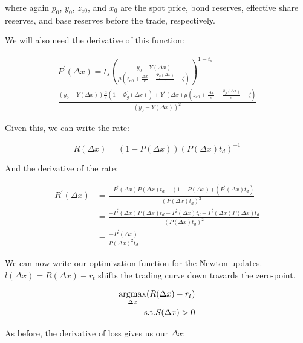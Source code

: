 where again $p_{0}$, $y_{0}$, $z_{e0}$, and $x_{0}$ are the spot price, bond reserves, effective share reserves, and base reserves before the trade, respectively.

We will also need the derivative of this function:

\begin{multline}
P^{\prime}(\Delta x) = t_{s} \left( \frac{y_{0} - Y(\Delta x)}{\mu \left( z_{e0} + \tfrac{\Delta x}{c} - \tfrac{\Phi_{g}(\Delta x)}{c} - \zeta \right)} \right)^{1 - t_{s}} \\
\frac{ \left( y_{0} - Y(\Delta x) \right) \tfrac{\mu}{c} \left( 1 - \Phi^{\prime}_{g}(\Delta x) \right) + Y^{\prime}(\Delta x) \mu \left( z_{e0} + \tfrac{\Delta x}{c} - \tfrac{\Phi_{g}(\Delta x)}{c} - \zeta \right)}{\left( y_{0} - Y(\Delta x) \right)^{2}}
\end{multline}

Given this, we can write the rate:

\begin{equation}
R(\Delta x) = \left( 1 - P(\Delta x) \right) \left( P(\Delta x) t_{d} \right)^{-1}
\end{equation}

And the derivative of the rate:

\begin{equation}
\begin{aligned}
R^{\prime}(\Delta x) &= \frac{-P^{\prime}(\Delta x) P(\Delta x) t_{d} - \left( 1 - P(\Delta x) \right) \left( P^{\prime}(\Delta x) t_{d} \right)}{(P(\Delta x) t_{d})^{2}} \\
&= \frac{-P^{\prime}(\Delta x) P(\Delta x) t_{d} - P^{\prime}(\Delta x) t_{d} + P^{\prime}(\Delta x) P(\Delta x) t_{d}}{(P(\Delta x) t_{d})^{2}} \\
&= \frac{-P^{\prime}(\Delta x)}{P(\Delta x)^2 t_{d}}
\end{aligned}
\end{equation}

We can now write our optimization function for the Newton updates.
$l(\Delta x) = R(\Delta x) - r_{t}$ shifts the trading curve down towards the zero-point.

\begin{equation}
\begin{split}
\argmax\limits_{\Delta x} (R(\Delta x) - r_{t}) \\
\text{s.t.} S(\Delta x) > 0
\end{split}
\end{equation}

As before, the derivative of loss gives us our $\Delta x$:

